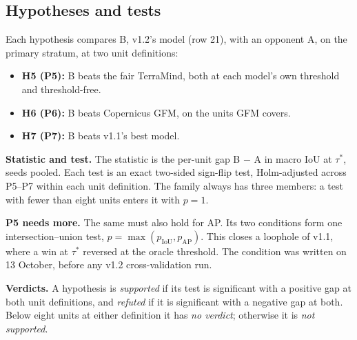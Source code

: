 \documentclass[10pt,twocolumn,a4paper]{article}
\begin{document}
\subsection{Hypotheses and tests}
Each hypothesis compares B, v1.2's model (row 21), with an opponent A, on the primary stratum, at two unit
definitions:
\begin{itemize}
  \item \textbf{H5 (P5):} B beats the fair TerraMind, both at each model's own threshold and threshold-free.
  \item \textbf{H6 (P6):} B beats Copernicus GFM, on the units GFM covers.
  \item \textbf{H7 (P7):} B beats v1.1's best model.
\end{itemize}
\textbf{Statistic and test.} The statistic is the per-unit gap B $-$ A in macro IoU at $\tau^{*}$, seeds pooled. Each
test is an exact two-sided sign-flip test, Holm-adjusted across P5--P7 within each unit definition. The family always
has three members: a test with fewer than eight units enters it with $p=1$.

\textbf{P5 needs more.} The same must also hold for AP. Its two conditions form one intersection--union test,
$p=\max(p_{\mathrm{IoU}}, p_{\mathrm{AP}})$. This closes a loophole of v1.1, where a win at $\tau^{*}$ reversed at
the oracle threshold. The condition was written on 13 October, before any v1.2 cross-validation run.

\textbf{Verdicts.} A hypothesis is \emph{supported} if its test is significant with a positive gap at both unit
definitions, and \emph{refuted} if it is significant with a negative gap at both. Below eight units at either
definition it has \emph{no verdict}; otherwise it is \emph{not supported}.
\end{document}
